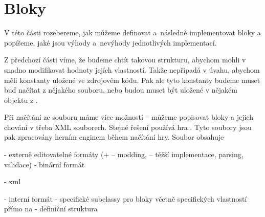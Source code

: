 
\section{Bloky}

V této části rozebereme, jak můžeme definovat a~následně implementovat bloky a popíšeme, jaké jsou výhody a~nevýhody jednotlivých implementací.

Z předchozí části víme, že budeme chtít takovou strukturu, abychom mohli v \UE{} snadno modifikovat hodnoty jejích vlastností. Takže nepřipadá v úvahu, abychom měli konstanty uložené ve zdrojovém kódu. Pak ale tyto konstanty budeme muset buď načítat z nějakého souboru, nebo budou muset být uložené v nějakém objektu z \UE{}.

Při načítání ze souboru máme více možností -- můžeme popisovat bloky a jejich chování v třeba XML souborech. Stejné řešení používá hra \ME{}. Tyto soubory jsou pak zpracovány herním enginem během načítání hry. Soubor obsahuje

- externě editovatelné formáty (+ -- modding, -- těžší implementace, parsing, validace)
- binární formát

- xml


- interní formát
- specifické subclassy pro bloky včetně specifických vlastností přímo na 
- definiční struktura





